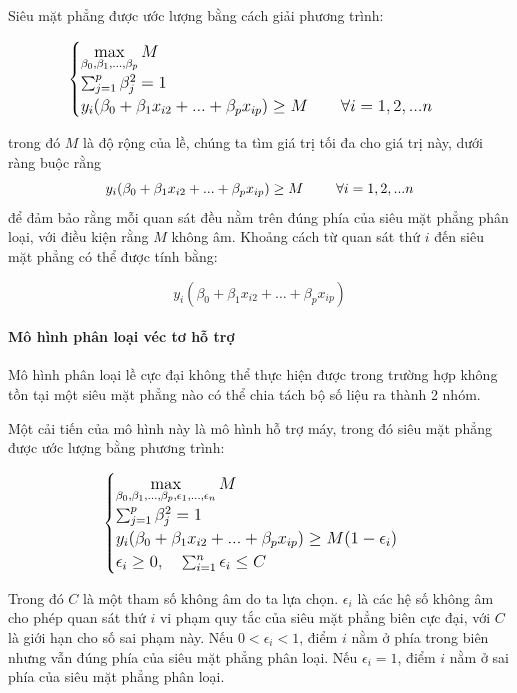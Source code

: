 \documentclass[a4paper]{report}\usepackage[]{graphicx}\usepackage[]{color}
\begin{document}
Siêu mặt phẳng được ước lượng bằng cách giải phương trình:


 $$
\large
\begin{cases}
\max\limits_{\beta_0, \beta_1,...,\beta_p}M\\

\sum_{j = 1}^p \beta_j^2 = 1\\

y_i(\beta_0 + \beta_1x_{i2} + ... + \beta_px_{ip}) \geq M \qquad \forall i = 1, 2, ...n
\end{cases}
$$

trong đó $M$ là độ rộng của lề, chúng ta tìm giá trị tối đa cho giá trị này, dưới ràng buộc rằng 
 $$
\large
y_i(\beta_0 + \beta_1x_{i2} + ... + \beta_px_{ip}) \geq M \qquad \forall i = 1, 2, ...n
$$
để đảm bảo rằng mỗi quan sát đều nằm trên đúng phía của siêu mặt phẳng phân loại, với điều kiện rằng $M$ không âm.
Khoảng cách từ quan sát thứ $i$ đến siêu mặt phẳng có thể được tính bằng: 

$$
y_i(\beta_0 + \beta_1x_{i2} + ... + \beta_px_{ip})
$$


\paragraph{Mô hình phân loại véc tơ hỗ trợ}

Mô hình phân loại lề cực đại không thể thực hiện được trong trường hợp không tồn tại một siêu mặt phẳng nào có thể chia tách bộ số liệu ra thành 2 nhóm.

Một cải tiến của mô hình này là mô hình hỗ trợ máy, trong đó siêu mặt phẳng được ước lượng bằng phương trình:

$$
\large
\begin{cases}
\max\limits_{\beta_0, \beta_1,...,\beta_p, \epsilon_1, ... , \epsilon_n}M\\

\sum_{j = 1}^p \beta_j^2 = 1\\

y_i(\beta_0 + \beta_1x_{i2} + ... + \beta_px_{ip}) \geq M(1-\epsilon_i) \\

\epsilon_i \geq 0, \quad \sum_{i = 1}^n \epsilon_i \leq C
\end{cases}
$$

Trong đó $C$ là một tham số không âm do ta lựa chọn. $\epsilon_i$ là các hệ số không âm cho phép quan sát thứ $i$ vi phạm quy tắc của siêu mặt phẳng biên cực đại, với $C$ là giới hạn cho số sai phạm này. Nếu $0 < \epsilon_i < 1$, điểm $i$ nằm ở phía trong biên nhưng vẫn đúng phía của siêu mặt phẳng phân loại. Nếu $\epsilon_i = 1$, điểm $i$ nằm ở sai phía của siêu mặt phẳng phân loại.
\end{document}
